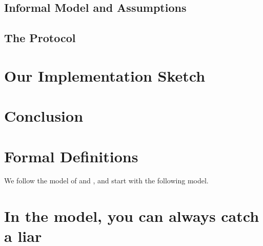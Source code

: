 \documentclass[12pt]{article}
\begin{document}
  \subsection{Informal Model and Assumptions}
  \subsection{The Protocol}
\section{Our Implementation Sketch}
\section{Conclusion}

{}


\appendix

\section{Formal Definitions}
  We follow the model of \cite{RoutingGames} and \cite{AgtBookDistributed},
  and start with the following model.

\section{In the \cite{RoutingGames} model, you can always catch a liar}
\end{document}
